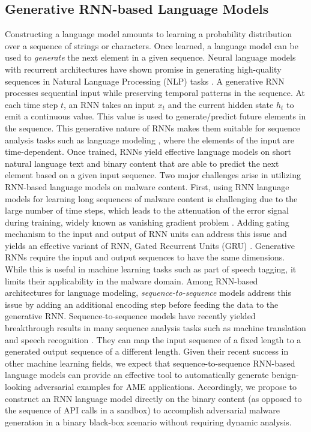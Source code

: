 \documentclass[letterpaper]{article}
\begin{document}
\subsection{Generative RNN-based Language Models}
\label{background_RNN}
Constructing a language model amounts to learning a probability distribution over a sequence of strings or characters. Once learned, a language model can be used to \textit{generate} the next element in a given sequence. Neural language models with recurrent architectures have shown promise in generating high-quality sequences in Natural Language Processing (NLP) tasks \cite{kim2016character}. A generative RNN processes sequential input while preserving temporal patterns in the sequence. At each time step $t$, an RNN takes an input $x_t$ and the current hidden state $h_t$ to emit a continuous value. This value is used to generate/predict future elements in the sequence. This generative nature of RNNs makes them suitable for sequence analysis tasks such as language modeling \cite{belletti2019quantifying}, where the elements of the input are time-dependent. Once trained, RNNs yield effective language models on short natural language text and binary content \cite{zuo2018neural} that are able to predict the next element based on a given input sequence.
Two major challenges arise in utilizing RNN-based language models on malware content. First, using RNN language models for learning long sequences of malware content is challenging \cite{raff2018malware} due to the large number of time steps, which leads to the attenuation of the error signal during training, widely known as vanishing gradient problem \cite{goldberg_neural_2017}. Adding gating mechanism to the input and output of RNN units can address this issue and yields an effective variant of RNN, Gated Recurrent Units (GRU) \cite{goldberg_neural_2017}.
Generative RNNs require the input and output sequences to have the same dimensions. While this is useful in machine learning tasks such as part of speech tagging, it limits their applicability in the malware domain. Among RNN-based architectures for language modeling, \emph{sequence-to-sequence} models address this issue by adding an additional encoding step before feeding the data to the generative RNN. Sequence-to-sequence models have recently yielded breakthrough results in many sequence analysis tasks such as machine translation \cite{ono-etal-2019-hybrid} and speech recognition \cite{irie2019choice}. They can map the input sequence of a fixed length to a generated output sequence of a different length. Given their recent success in other machine learning fields, we expect that sequence-to-sequence RNN-based language models can provide an effective tool to automatically generate benign-looking adversarial examples for AME applications. Accordingly, we propose to construct an RNN language model directly on the binary content (as opposed to the sequence of API calls in a sandbox) to accomplish adversarial malware generation in a binary black-box scenario without requiring dynamic analysis.
\end{document}
